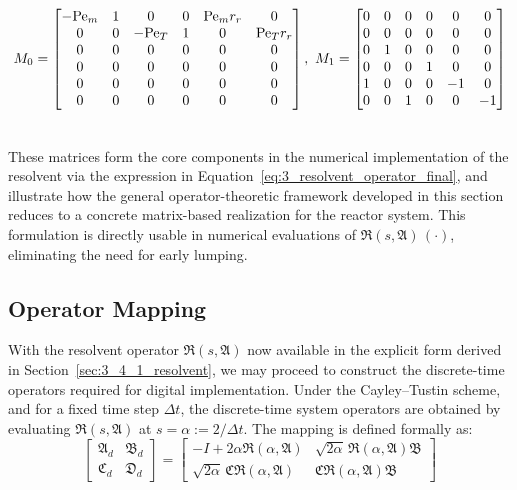 \begin{equation} \label{eq:3_example_M0M1}
\begin{aligned}
M_0 &= 
\begin{bmatrix}
-{\rm Pe}_m & 1 & 0 & 0 & {\rm Pe}_m r_r & 0 \\
0 & 0 & -{\rm Pe}_T & 1 & 0 & {\rm Pe}_T r_r \\
0 & 0 & 0 & 0 & 0 & 0 \\
0 & 0 & 0 & 0 & 0 & 0 \\
0 & 0 & 0 & 0 & 0 & 0 \\
0 & 0 & 0 & 0 & 0 & 0
\end{bmatrix}, \, \, 
M_1 = 
\begin{bmatrix}
0 & 0 & 0 & 0 & 0 & 0 \\
0 & 0 & 0 & 0 & 0 & 0 \\
0 & 1 & 0 & 0 & 0 & 0 \\
0 & 0 & 0 & 1 & 0 & 0 \\
1 & 0 & 0 & 0 & -1 & 0 \\
0 & 0 & 1 & 0 & 0 & -1
\end{bmatrix} \\
\, \\
\end{aligned}
\end{equation}

These matrices form the core components in the numerical implementation of the resolvent via the expression in Equation~\eqref{eq:3_resolvent_operator_final}, and illustrate how the general operator-theoretic framework developed in this section reduces to a concrete matrix-based realization for the reactor system. This formulation is directly usable in numerical evaluations of $\mathfrak{R}(s, \mathfrak{A})\, (\cdot)$, eliminating the need for early lumping.


\subsection{Operator Mapping} \label{sec:3_4_2_dt_operators}

With the resolvent operator $\mathfrak{R}(s, \mathfrak{A})$ now available in the explicit form derived in Section~\ref{sec:3_4_1_resolvent}, we may proceed to construct the discrete-time operators required for digital implementation. Under the Cayley--Tustin scheme, and for a fixed time step $\Delta t$, the discrete-time system operators are obtained by evaluating $\mathfrak{R}(s, \mathfrak{A})$ at $s = \alpha := 2 / \Delta t$. The mapping is defined formally as:
\begin{equation} \label{eq:3_discrete_mappings}
\begin{bmatrix}
\mathfrak{A}_d & \mathfrak{B}_d \\
\mathfrak{C}_d & \mathfrak{D}_d
\end{bmatrix}
=
\begin{bmatrix}
-I + 2\alpha \mathfrak{R}(\alpha, \mathfrak{A}) & \sqrt{2\alpha}\, \mathfrak{R}(\alpha, \mathfrak{A}) \mathfrak{B} \\
\sqrt{2\alpha}\, \mathfrak{C} \mathfrak{R}(\alpha, \mathfrak{A}) & \mathfrak{C} \mathfrak{R}(\alpha, \mathfrak{A}) \mathfrak{B}
\end{bmatrix}
\end{equation}

